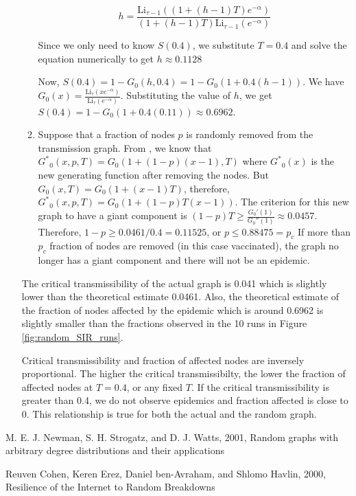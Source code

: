 \documentclass{article}
\newcommand{\Li}{\text{Li}}
\begin{document}
\begin{enumerate}
\begin{enumerate}
$$ h = \frac{\Li_{\tau -1}((1 + (h-1)T)e^{-\alpha})}{(1 + (h-1)T)\Li_{\tau -1}(e^{-\alpha})}$$

Since we only need to know $S(0.4)$, we substitute $T=0.4$ and solve the equation numerically to get $h \approx 0.1128$

Now, $S(0.4) = 1 - G_0(h, 0.4) = 1 - G_0(1 + 0.4(h-1))$. We have $G_0(x) = \frac{\Li_{\tau}(xe^{-\alpha})}{\Li_{\tau}(e^{-\alpha})}$. Substituting the value of $h$, we get $S(0.4) = 1 - G_0(1 + 0.4(0.11) ) \approx  0.6962$.

\item Suppose that a fraction of nodes $p$ is randomly removed from the transmission graph. From \cite{cohen}, we know that ${G^*}_0(x, p, T) = G_0(1 + (1-p)(x-1), T )$ where ${G^*}_0(x)$ is the new generating function after removing the nodes. But $G_0(x, T) = G_0(1 + (x-1)T)$, therefore, ${G^*}_0(x, p, T) = G_0(1 + (1-p)T(x-1))$. 
The criterion for this new graph to have a giant component is $(1-p)T \geq \frac{G_0'(1)}{G_0''(1)} \approx 0.0457$. Therefore, $1-p \geq 0.0461/0.4 = 0.11525$, or $p \leq 0.88475 = p_c$ If more than $p_c$ fraction of nodes are removed (in this case vaccinated), the graph no longer has a giant component and there will not be an epidemic.

\end{enumerate}

The critical transmissibility of the actual graph is 0.041 which is slightly lower than the theoretical estimate 0.0461. Also, the theoretical estimate of the fraction of nodes affected by the epidemic which is around 0.6962 is slightly smaller than the fractions observed in the 10 runs in Figure \ref{fig:random_SIR_runs}. 

Critical transmissibility and fraction of affected nodes are inversely proportional. The higher the critical transmissibilty, the lower the fraction of affected nodes at $T=0.4$, or any fixed $T$. If the critical transmissibility is greater than 0.4, we do not observe epidemics and fraction affected is close to 0. This relationship is true for both the actual and the random graph.

\end{enumerate}

\begin{thebibliography}{2}

 M. E. J. Newman, S. H. Strogatz, and D. J. Watts, 2001, Random graphs with arbitrary degree distributions and their applications

 Reuven Cohen, Keren Erez, Daniel ben-Avraham, and Shlomo Havlin, 2000, Resilience of the Internet to Random Breakdowns

\end{thebibliography}
\end{document}
